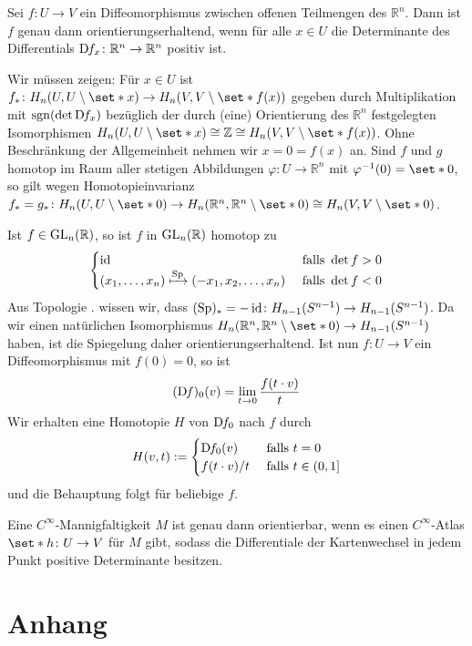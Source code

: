 \begin{lemma}
	Sei $f \colon U \to V$ ein Diffeomorphismus zwischen offenen Teilmengen des $\mathbb{R}^n$.
	Dann ist $f$ genau dann orientierungserhaltend, wenn für alle $x \in U$ die Determinante des Differentials $\mathrm{D}\mkern-1.5mu f_x \colon \mathbb{R}^n \to \mathbb{R}^n$ positiv ist.
\end{lemma}
\begin{beweis}
	Wir müssen zeigen: Für $x \in U$ ist $f_* \colon H_n \enbrace*{U,U\setminus \set*{x}} \to H_n \enbrace*{V,V \setminus \set*{f(x)}}$ gegeben durch Multiplikation mit $\sgn \enbrace*{\det \D f_x}$ bezüglich der durch (eine) Orientierung des $\mathbb{R}^n$ festgelegten Isomorphismen $H_n \enbrace*{U,U \setminus \set*{x}} \cong \mathbb{Z} \cong H_n \enbrace*{V,V\setminus \set*{f(x)}}$.
	Ohne Beschränkung der Allgemeinheit nehmen wir $x=0=f(x)$ an.
	Sind $f$ und $g$ homotop im Raum aller stetigen Abbildungen $\varphi \colon U \to \mathbb{R}^n$ mit $\varphi^{-1}(0)=\set*{0}$, so gilt wegen Homotopieinvarianz 
	$f_*=g_* \colon H_n \enbrace*{U,U \setminus \set*{0}} \to H_n \enbrace*{\mathbb{R}^n,\mathbb{R}^n\setminus \set*{0}} \cong H_n \enbrace*{V,V \setminus \set*{0}}$.
	
	Ist $f \in \operatorname{GL}_n(\mathbb{R})$, so ist $f$ in $\operatorname{GL}_n(\mathbb{R})$ homotop zu 
	\[
		\begin{cases}
			\operatorname{id} &\text{ falls }\det f >0\\
			(x_1,\ldots ,x_n) \xmapsto{\operatorname{Sp}} (-x_1,x_2,\ldots ,x_n) &\text{ falls } \det f < 0
		\end{cases}
	\]
	Aus Topologie . wissen wir, dass $(\operatorname{Sp})_* = - \operatorname{id} \colon H_{n-1}(S^{n-1}) \to H_{n-1}(S^{n-1})$.
	Da wir einen natürlichen Isomorphismus $H_n(\mathbb{R}^n,\mathbb{R}^n \setminus \set*{0}) \to H_{n-1}(S^{n-1})$ haben, ist die Spiegelung daher orientierungserhaltend.
	Ist nun $f \colon U \to V$ ein Diffeomorphismus mit $f(0)=0$, so ist 
	\[
		(\mathrm{D}\mkern-1.5mu f)_0 (v) = \lim_{t \to 0} \frac{f(t \cdot v)}{t} 
	\]
	Wir erhalten eine Homotopie $H$ von $\mathrm{D}\mkern-1.5mu f_0$ nach $f$ durch 
	\[
		H(v,t) := \begin{cases}
			\mathrm{D}\mkern-1.5mu f_0(v) &\text{ falls }t=0\\
			f(t \cdot v) /t &\text{ falls } t \in (0,1]
		\end{cases}
	\]
	und die Behauptung folgt für beliebige $f$.
\end{beweis}

\begin{korollarB}
	Eine $C^\infty$-Mannigfaltigkeit $M$ ist genau dann orientierbar, wenn es einen $C^\infty$-Atlas $\set*{h \colon U \to V}$ für $M$ gibt, sodass die Differentiale der Kartenwechsel in jedem Punkt positive Determinante besitzen.
\end{korollarB}


\cleardoubleoddemptypage
{}
\setcounter{page}{1}
\cleardoubleoddemptypage
\appendix

\section{Anhang} %
\label{sec:anhang}

\printindex
\printbibliography
\listoffigures
\todototoc
{}

